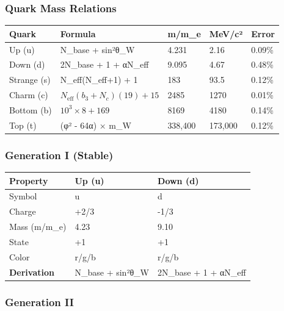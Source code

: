 \documentclass[
  11pt,
  letterpaper,
  twoside,
  openany]{book}
\makeatletter
\let\orig@subsubsection\subsubsection
\renewcommand{\subsubsection}{\needspace{5\baselineskip}\orig@subsubsection}
\makeatother
\begin{document}
\subsubsection{Quark Mass Relations}\label{quark-mass-relations}

\begin{longtable}[]{@{}lllll@{}}
\toprule\noalign{}
Quark & Formula & m/m\_e & MeV/c² & Error \\
\midrule\noalign{}
\endhead
\bottomrule\noalign{}
\endlastfoot
Up (u) & N\_base + sin²θ\_W & 4.231 & 2.16 & 0.09\% \\
Down (d) & 2N\_base + 1 + αN\_eff & 9.095 & 4.67 & 0.48\% \\
Strange (s) & N\_eff(N\_eff+1) + 1 & 183 & 93.5 & 0.12\% \\
Charm (c) & \(N_{\text{eff}}(b_3+N_c)(19) + 15\) & 2485 & 1270 &
0.01\% \\
Bottom (b) & \(10^3 \times 8 + 169\) & 8169 & 4180 & 0.14\% \\
Top (t) & (φ² - 64α) × m\_W & 338,400 & 173,000 & 0.12\% \\
\end{longtable}

\subsubsection{Generation I (Stable)}\label{generation-i-stable}

\begin{longtable}[]{@{}lll@{}}
\toprule\noalign{}
Property & Up (u) & Down (d) \\
\midrule\noalign{}
\endhead
\bottomrule\noalign{}
\endlastfoot
Symbol & u & d \\
Charge & +2/3 & -1/3 \\
Mass (m/m\_e) & 4.23 & 9.10 \\
State & +1 & +1 \\
Color & r/g/b & r/g/b \\
\textbf{Derivation} & N\_base + sin²θ\_W & 2N\_base + 1 + αN\_eff \\
\end{longtable}

\subsubsection{Generation II}\label{generation-ii}
\end{document}
